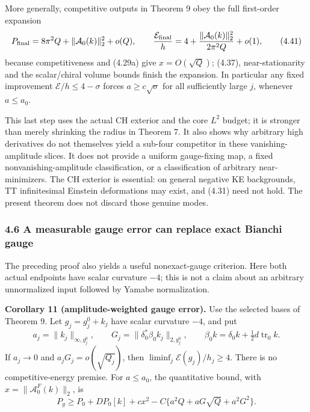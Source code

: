 \documentclass[
  10pt,
]{article}
\begin{document}
More generally, competitive outputs in Theorem 9 obey the full
first-order expansion \[
 P_{\rm final}=8\pi^2Q+\|\mathcal A_0(k)\|_2^2+o(Q),\qquad
 \frac{\mathcal E_{\rm final}}h
       =4+\frac{\|\mathcal A_0(k)\|_2^2}{2\pi^2Q}+o(1),
 \tag{4.41}
\] because competitiveness and (4.29a) give \(x=O(\sqrt Q)\); (4.37),
near-stationarity and the scalar/chiral volume bounds finish the
expansion. In particular any fixed improvement
\(\mathcal E/h\le4-\sigma\) forces \(a\ge c\sqrt{\sigma}\) for all
sufficiently large \(j\), whenever \(a\le a_0\).

This last step uses the actual CH exterior and the core \(L^2\) budget;
it is stronger than merely shrinking the radius in Theorem 7. It also
shows why arbitrary high derivatives do not themselves yield a sub-four
competitor in these vanishing-amplitude slices. It does not provide a
uniform gauge-fixing map, a fixed nonvanishing-amplitude classification,
or a classification of arbitrary near-minimizers. The CH exterior is
essential: on general negative KE backgrounds, TT infinitesimal Einstein
deformations may exist, and (4.31) need not hold. The present theorem
does not discard those genuine modes.

\hypertarget{a-measurable-gauge-error-can-replace-exact-bianchi-gauge}{%
\subsubsection{4.6 A measurable gauge error can replace exact Bianchi
gauge}\label{a-measurable-gauge-error-can-replace-exact-bianchi-gauge}}

The preceding proof also yields a useful nonexact-gauge criterion. Here
both actual endpoints have scalar curvature \(-4\); this is not a claim
about an arbitrary unnormalized input followed by Yamabe normalization.

\textbf{Corollary 11 (amplitude-weighted gauge error).} Use the selected
bases of Theorem 9. Let \(g_j=g_j^0+k_j\) have scalar curvature \(-4\),
and put \[
 a_j=\|k_j\|_{\infty,g_j^0},\qquad
 G_j=\|\delta_0^*\beta_0 k_j\|_{2,g_j^0},\qquad
 \beta_0k=\delta_0k+\tfrac12d\operatorname{tr}_0k.
\] If \(a_j\to0\) and \(a_jG_j=o(\sqrt{Q_j})\), then
\(\liminf_j\mathcal E(g_j)/h_j\ge4\). There is no competitive-energy
premise. For \(a\le a_0\), the quantitative bound, with
\(x=\|\mathcal A_0^F(k)\|_2\), is \[
 \boxed{P_g\ge P_0+DP_0[k]+c x^2
             -C\{a^2Q+aG\sqrt Q+a^2G^2\}.} \tag{4.42}
\]
\end{document}
